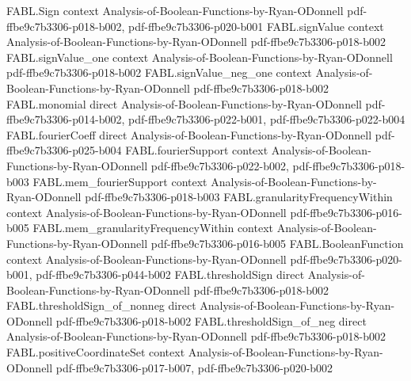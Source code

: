 \begin{theorem}
\label{FABL.coordinateExpectation_monomial}
\leanok
{}
\proofstep
  {FABL.Sign}
  {context}
  {Analysis-of-Boolean-Functions-by-Ryan-ODonnell}
  {pdf-ffbe9c7b3306-p018-b002,
    pdf-ffbe9c7b3306-p020-b001}
\proofstep
  {FABL.signValue}
  {context}
  {Analysis-of-Boolean-Functions-by-Ryan-ODonnell}
  {pdf-ffbe9c7b3306-p018-b002}
\proofstep
  {FABL.signValue_one}
  {context}
  {Analysis-of-Boolean-Functions-by-Ryan-ODonnell}
  {pdf-ffbe9c7b3306-p018-b002}
\proofstep
  {FABL.signValue_neg_one}
  {context}
  {Analysis-of-Boolean-Functions-by-Ryan-ODonnell}
  {pdf-ffbe9c7b3306-p018-b002}
\proofstep
  {FABL.monomial}
  {direct}
  {Analysis-of-Boolean-Functions-by-Ryan-ODonnell}
  {pdf-ffbe9c7b3306-p014-b002,
    pdf-ffbe9c7b3306-p022-b001,
    pdf-ffbe9c7b3306-p022-b004}
\proofstep
  {FABL.fourierCoeff}
  {direct}
  {Analysis-of-Boolean-Functions-by-Ryan-ODonnell}
  {pdf-ffbe9c7b3306-p025-b004}
\proofstep
  {FABL.fourierSupport}
  {context}
  {Analysis-of-Boolean-Functions-by-Ryan-ODonnell}
  {pdf-ffbe9c7b3306-p022-b002,
    pdf-ffbe9c7b3306-p018-b003}
\proofstep
  {FABL.mem_fourierSupport}
  {context}
  {Analysis-of-Boolean-Functions-by-Ryan-ODonnell}
  {pdf-ffbe9c7b3306-p018-b003}
\proofstep
  {FABL.granularityFrequencyWithin}
  {context}
  {Analysis-of-Boolean-Functions-by-Ryan-ODonnell}
  {pdf-ffbe9c7b3306-p016-b005}
\proofstep
  {FABL.mem_granularityFrequencyWithin}
  {context}
  {Analysis-of-Boolean-Functions-by-Ryan-ODonnell}
  {pdf-ffbe9c7b3306-p016-b005}
\proofstep
  {FABL.BooleanFunction}
  {context}
  {Analysis-of-Boolean-Functions-by-Ryan-ODonnell}
  {pdf-ffbe9c7b3306-p020-b001,
    pdf-ffbe9c7b3306-p044-b002}
\proofstep
  {FABL.thresholdSign}
  {direct}
  {Analysis-of-Boolean-Functions-by-Ryan-ODonnell}
  {pdf-ffbe9c7b3306-p018-b002}
\proofstep
  {FABL.thresholdSign_of_nonneg}
  {direct}
  {Analysis-of-Boolean-Functions-by-Ryan-ODonnell}
  {pdf-ffbe9c7b3306-p018-b002}
\proofstep
  {FABL.thresholdSign_of_neg}
  {direct}
  {Analysis-of-Boolean-Functions-by-Ryan-ODonnell}
  {pdf-ffbe9c7b3306-p018-b002}
\proofstep
  {FABL.positiveCoordinateSet}
  {context}
  {Analysis-of-Boolean-Functions-by-Ryan-ODonnell}
  {pdf-ffbe9c7b3306-p017-b007,
    pdf-ffbe9c7b3306-p020-b002}

\end{theorem}
